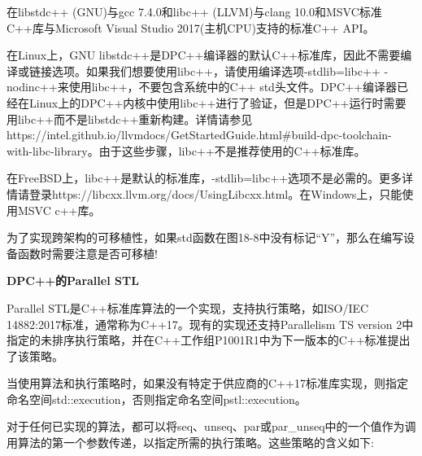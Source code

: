 在libstdc++ (GNU)与gcc 7.4.0和libc++ (LLVM)与clang 10.0和MSVC标准C++库与Microsoft Visual Studio 2017(主机CPU)支持的标准C++ API。\par

在Linux上，GNU libstdc++是DPC++编译器的默认C++标准库，因此不需要编译或链接选项。如果我们想要使用libc++，请使用编译选项-stdlib=libc++ -nodinc++来使用libc++，不要包含系统中的C++ std头文件。DPC++编译器已经在Linux上的DPC++内核中使用libc++进行了验证，但是DPC++运行时需要用libc++而不是libstdc++重新构建。详情请参见https://intel.github.io/llvmdocs/GetStartedGuide.html\#build-dpc-toolchain-with-libc-library。由于这些步骤，libc++不是推荐使用的C++标准库。\par

在FreeBSD上，libc++是默认的标准库，-stdlib=libc++选项不是必需的。更多详情请登录https://libcxx.llvm.org/docs/UsingLibcxx.html。在Windows上，只能使用MSVC c++库。\par

\begin{tcolorbox}[colback=red!5!white,colframe=red!75!black]
为了实现跨架构的可移植性，如果std函数在图18-8中没有标记“Y”，那么在编写设备函数时需要注意是否可移植!
\end{tcolorbox}

\hspace*{\fill} \par %
\textbf{DPC++的Parallel STL}

Parallel STL是C++标准库算法的一个实现，支持执行策略，如ISO/IEC 14882:2017标准，通常称为C++17。现有的实现还支持Parallelism TS version 2中指定的未排序执行策略，并在C++工作组P1001R1中为下一版本的C++标准提出了该策略。\par

当使用算法和执行策略时，如果没有特定于供应商的C++17标准库实现，则指定命名空间std::execution，否则指定命名空间pstl::execution。\par

对于任何已实现的算法，都可以将seq、unseq、par或par\_unseq中的一个值作为调用算法的第一个参数传递，以指定所需的执行策略。这些策略的含义如下:\par

